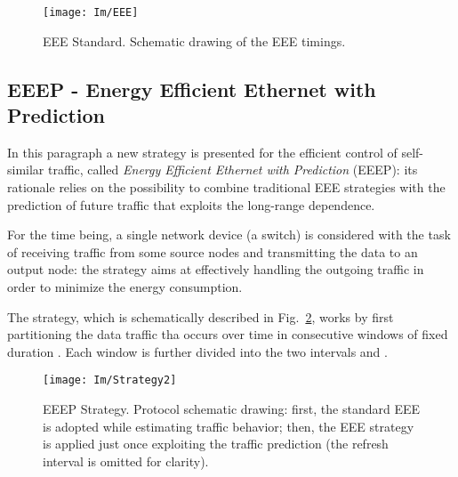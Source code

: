 \documentclass[journal,10pt,twoside,final]{IEEEtran}
\begin{document}
\begin{figure}[h]
\centering
\texttt{[image: Im/EEE]}
\caption{EEE Standard. Schematic drawing of the EEE timings.}
\label{fig:EEE}
\end{figure}

\subsection{EEEP - Energy Efficient Ethernet with Prediction}
\label{subsec:EEEP}

In this paragraph a new strategy is presented for the efficient control of self-similar traffic, called \emph{Energy Efficient Ethernet with Prediction} (EEEP): its rationale relies on the possibility to combine traditional EEE strategies with the prediction of future traffic that exploits the long-range dependence.

For the time being, a single network device (a switch) is considered with the task of receiving traffic from some source nodes and transmitting the data to an output node: the strategy aims at effectively handling the outgoing traffic in order to minimize the energy consumption.

The strategy, which is schematically described in Fig.~\ref{fig:EEEP}, works by first partitioning the data traffic tha occurs over time in consecutive windows of fixed duration . Each window is further divided into the two intervals  and .
\begin{figure}[ht!]
\centering
\texttt{[image: Im/Strategy2]}
\vspace{-0.0cm}
\caption{EEEP Strategy. Protocol schematic drawing: first, the standard EEE is adopted while estimating traffic behavior; then, the EEE strategy is applied just once exploiting the traffic prediction (the refresh interval is omitted for clarity).}
\label{fig:EEEP}
\end{figure}
\end{document}
